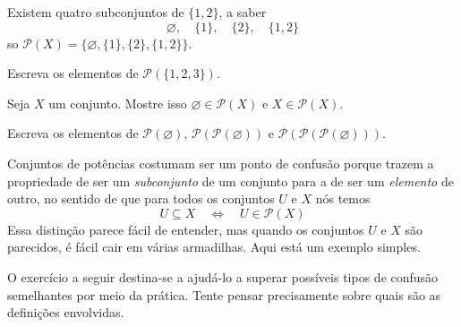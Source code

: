\begin{example}
Existem quatro subconjuntos de $\{ 1, 2 \}$, a saber
\[ \varnothing, \quad \{ 1 \}, \quad \{ 2 \}, \quad \{ 1, 2 \} \]
so $\mathcal{P}(X) = \{\varnothing, \{ 1 \}, \{ 2 \}, \{ 1, 2 \}\}$.
\end{example}

\begin{exercise}
Escreva os elementos de $\mathcal{P}(\{1, 2, 3\})$.
\end{exercise}

\begin{exercise}
Seja $X$ um conjunto. Mostre isso $\varnothing \in \mathcal{P}(X)$ e $X \in \mathcal{P}(X)$.
\end{exercise}

\begin{exercise}
Escreva os elementos de $\mathcal{P}(\varnothing)$, $\mathcal{P}(\mathcal{P}(\varnothing))$ e $\mathcal{P}(\mathcal{P}(\mathcal{P}(\varnothing)))$.
\end{exercise}

Conjuntos de potências costumam ser um ponto de confusão porque trazem a propriedade de ser um \textit{subconjunto} de um conjunto para a de ser um \textit{elemento} de outro, no sentido de que para todos os conjuntos $U$ e $X $ nós temos
\[ U \subseteq X \quad \Leftrightarrow \quad U \in \mathcal{P}(X) \]
Essa distinção parece fácil de entender, mas quando os conjuntos $U$ e $X$ são parecidos, é fácil cair em várias armadilhas. Aqui está um exemplo simples.


O exercício a seguir destina-se a ajudá-lo a superar possíveis tipos de confusão semelhantes por meio da prática. Tente pensar precisamente sobre quais são as definições envolvidas.

